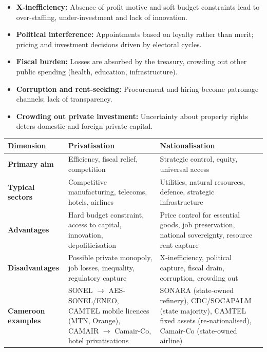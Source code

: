 \documentclass[11pt]{article}
\begin{document}
\begin{propriete}
\begin{itemize}
    \item \textbf{X‑inefficiency:} Absence of profit motive and soft budget constraints lead to over‑staffing, under‑investment and lack of innovation.
    \item \textbf{Political interference:} Appointments based on loyalty rather than merit; pricing and investment decisions driven by electoral cycles.
    \item \textbf{Fiscal burden:} Losses are absorbed by the treasury, crowding out other public spending (health, education, infrastructure).
    \item \textbf{Corruption and rent‑seeking:} Procurement and hiring become patronage channels; lack of transparency.
    \item \textbf{Crowding out private investment:} Uncertainty about property rights deters domestic and foreign private capital.
\end{itemize}
\end{propriete}

\begin{aretenir}
\begin{center}
\begin{tabularx}{\linewidth}{|l|X|X|}
\hline
\rowcolor{popblueL}
\textbf{Dimension} & \textbf{Privatisation} & \textbf{Nationalisation} \\ \hline
\textbf{Primary aim} & Efficiency, fiscal relief, competition & Strategic control, equity, universal access \\ \hline
\textbf{Typical sectors} & Competitive manufacturing, telecoms, hotels, airlines & Utilities, natural resources, defence, strategic infrastructure \\ \hline
\textbf{Advantages} & Hard budget constraint, access to capital, innovation, depoliticisation & Price control for essential goods, job preservation, national sovereignty, resource rent capture \\ \hline
\textbf{Disadvantages} & Possible private monopoly, job losses, inequality, regulatory capture & X‑inefficiency, political capture, fiscal drain, corruption, crowding out \\ \hline
\textbf{Cameroon examples} & SONEL $\rightarrow$ AES-SONEL/ENEO, CAMTEL mobile licences (MTN, Orange), CAMAIR $\rightarrow$ Camair‑Co, hotel privatisations & SONARA (state‑owned refinery), CDC/SOCAPALM (state majority), CAMTEL fixed assets (re‑nationalised), Camair‑Co (state-owned airline) \\ \hline
\end{tabularx}
\end{center}
\end{aretenir}
\end{document}
